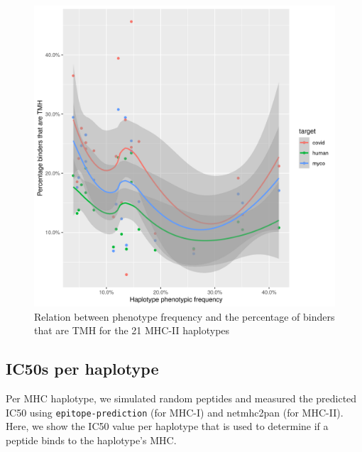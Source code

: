 \begin{figure}[!htbp]
  \includegraphics[width=\textwidth]{haplotype_freq_vs_f_tmh_epitopes/phenotype_freq_vs_f_tmh_binders.png}
  \caption{
    Relation between phenotype frequency and the percentage
    of binders that are TMH for the 21 MHC-II haplotypes
  }
  \label{fig:phenotype_freq_vs_f_tmh_binders}
\end{figure}

\subsection{IC50s per haplotype}
\label{subsec:ic50s_per_haplotype}

Per MHC haplotype, we simulated random peptides and measured the
predicted IC50 using \verb;epitope-prediction; (for MHC-I) 
and netmhc2pan (for MHC-II). 
Here, we show the IC50 value per haplotype that
is used to determine if a peptide binds to the haplotype's MHC.

% 


